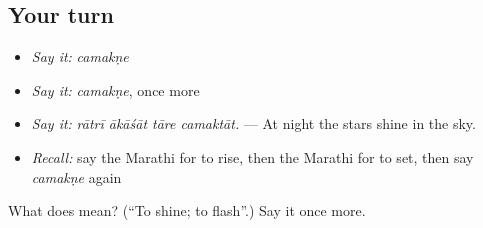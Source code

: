 \subsection*{Your turn}
\begin{itemize}
\raggedright
  \item \emph{Say it:} \emph{camakṇe}
  \item \emph{Say it:} \emph{camakṇe}, once more
  \item \emph{Say it:} \emph{rātrī ākāśāt tāre camaktāt.} — At night the stars shine in the sky.
  \item \emph{Recall:} say the Marathi for to rise, then the Marathi for to set, then say \emph{camakṇe} again
\end{itemize}

\begin{tcolorbox}[breakable,colback=teal!4,colframe=teal!35!black,title={Before you move on}]
What does  mean? (\textquotedblleft{}To shine; to flash\textquotedblright{}.) Say it once more.
\end{tcolorbox}
